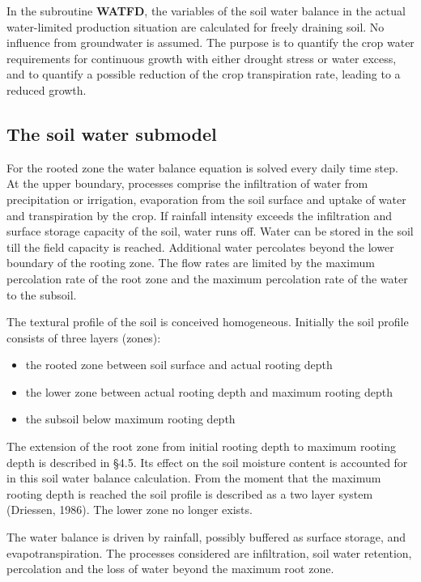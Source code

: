 In the subroutine {\bf WATFD}, the variables of the soil water balance in the actual 
water-limited production situation are calculated for freely draining soil. No influence from
groundwater is assumed. The purpose is to quantify the crop water requirements for
continuous growth with either drought stress or water excess, and to quantify a possible
reduction of the crop transpiration rate, leading to a reduced growth.

\subsection{The soil water submodel}

For the rooted zone the water balance equation is solved every daily time step. At the
upper boundary, processes comprise the infiltration of water from precipitation or
irrigation, evaporation from the soil surface and uptake of water and transpiration by the
crop. If rainfall intensity exceeds the infiltration and surface storage capacity of the soil,
water runs off. Water can be stored in the soil till the field capacity is reached. Additional
water percolates beyond the lower boundary of the rooting zone.
The flow rates are limited by the maximum percolation rate of the root zone and the
maximum percolation rate of the water to the subsoil.

The textural profile of the soil is conceived homogeneous. Initially the soil profile
consists of three layers (zones):
\begin{itemize}
\item the rooted zone between soil surface and actual rooting depth
\item the lower zone between actual rooting depth and maximum rooting depth
\item the subsoil below maximum rooting depth
\end{itemize}

The extension of the root zone from initial rooting depth to maximum rooting depth is
described in \S 4.5. Its effect on the soil moisture content is accounted for in this soil water
balance calculation. From the moment that the maximum rooting depth is reached the soil
profile is described as a two layer system (Driessen, 1986). The lower zone no longer
exists.

The water balance is driven by rainfall, possibly buffered as surface storage, and
evapotranspiration. The processes considered are infiltration, soil water retention,
percolation and the loss of water beyond the maximum root zone.

